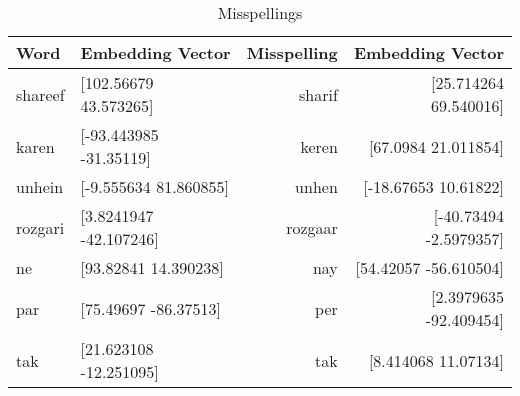 \documentclass{exam}
\begin{document}
\begin{table}[h!]
  			\begin{center}
    			\caption{Misspellings}
    			\begin{tabular}{l|l|r|r}
      				\textbf{Word} & \textbf{Embedding Vector} & \textbf{Misspelling} & \textbf{Embedding Vector}\\
      				\hline
      				shareef & [102.56679   43.573265] & sharif & [25.714264 69.540016]\\
      				karen & [-93.443985 -31.35119] & keren & [67.0984   21.011854]\\
      				unhein & [-9.555634 81.860855] & unhen & [-18.67653  10.61822]\\
      				rozgari & [3.8241947 -42.107246] & rozgaar & [-40.73494    -2.5979357]\\
      				ne & [93.82841  14.390238] & nay & [54.42057  -56.610504]\\
      				par & [75.49697 -86.37513] & per & [2.3979635 -92.409454]\\
     				tak & [21.623108 -12.251095] & tak & [8.414068 11.07134]\\
    			\end{tabular}
  			\end{center}
\end{table}
\end{document}
